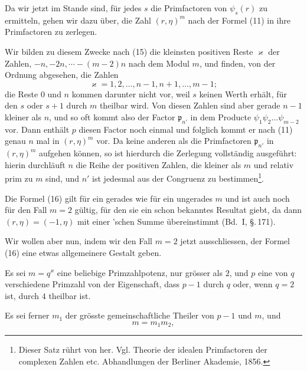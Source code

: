 Da wir jetzt im Stande sind, für jedes $s$ die Primfactoren von $\psi_s(r)$ zu ermitteln, gehen wir dazu über, die Zahl $(r,\eta)^m$ nach der Formel (11) in ihre Primfactoren zu zerlegen.

Wir bilden zu diesem Zwecke nach (15) die kleinsten positiven Reste $\varkappa$ der Zahlen, $-n, -2n, \cdots -(m-2)n$ nach dem Modul $m$, und finden, von der Ordnung abgesehen, die Zahlen
\[
\varkappa = 1, 2, \ldots, n-1, n+1, \ldots, m-1;
\]
die Reste $0$ und $n$ kommen darunter nicht vor, weil $s$ keinen Werth erhält, für den $s$ oder $s+1$ durch $m$ theilbar wird. Von diesen Zahlen sind aber gerade $n-1$ kleiner als $n$, und so oft kommt also der Factor $\mathfrak{p}_{n'}$ in dem Producte $\psi_1\psi_2\ldots\psi_{m-2}$ vor. Dann enthält $p$ diesen Factor noch einmal und folglich kommt er nach (11) genau $n$ mal in $(r,\eta)^m$ vor. Da keine anderen als die Primfactoren $\mathfrak{p}_{n'}$ in $(r,\eta)^m$ aufgehen können, so ist hierdurch die Zerlegung vollständig ausgeführt:
hierin durchläuft $n$ die Reihe der positiven Zahlen, die kleiner als $m$ und relativ prim zu $m$ sind, und $n'$ ist jedesmal aus der Congruenz
zu bestimmen\footnote{Dieser Satz rührt von  her. Vgl. Theorie der idealen Primfactoren der complexen Zahlen etc. Abhandlungen der Berliner Akademie, 1856.}.

Die Formel (16) gilt für ein gerades wie für ein ungerades $m$ und ist auch noch für den Fall $m=2$ gültig, für den sie ein schon bekanntes Resultat giebt, da dann $(r,\eta) = (-1,\eta)$ mit einer 'schen Summe übereinstimmt (Bd.\ I, \S.\,171).

Wir wollen aber nun, indem wir den Fall $m=2$ jetzt ausschliessen, der Formel (16) eine etwas allgemeinere Gestalt geben.

Es sei $m=q^{\varkappa}$ eine beliebige Primzahlpotenz, nur grösser als $2$, und $p$ eine von $q$ verschiedene Primzahl von der Eigenschaft, dass $p-1$ durch $q$ oder, wenn $q=2$ ist, durch $4$ theilbar ist.

Es sei ferner $m_1$ der grösste gemeinschaftliche Theiler von $p-1$ und $m$, und
\[
m = m_1 m_2,
\]
